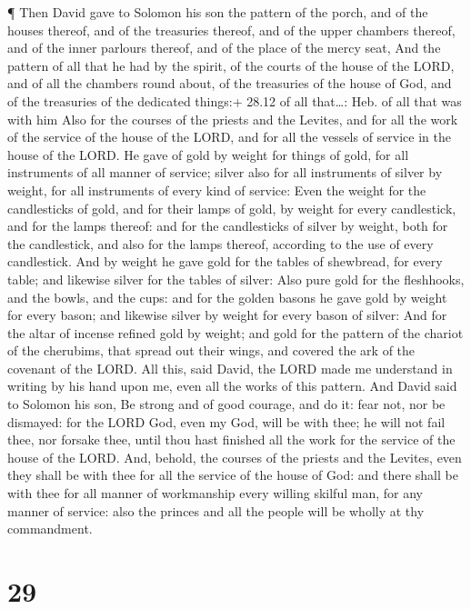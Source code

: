  ¶ Then David gave to Solomon his son the pattern of the
porch, and of the houses thereof, and of the treasuries thereof, and of
the upper chambers thereof, and of the inner parlours thereof, and of
the place of the mercy seat,  And the pattern of all that
he had by the spirit, of the courts of the house of the LORD, and of all
the chambers round about, of the treasuries of the house of God, and of
the treasuries of the dedicated things:+ 28.12 of all that\ldots: Heb.
of all that was with him  Also for the courses of the
priests and the Levites, and for all the work of the service of the
house of the LORD, and for all the vessels of service in the house of
the LORD.  He gave of gold by weight for things of gold,
for all instruments of all manner of service; silver also for all
instruments of silver by weight, for all instruments of every kind of
service:  Even the weight for the candlesticks of gold, and
for their lamps of gold, by weight for every candlestick, and for the
lamps thereof: and for the candlesticks of silver by weight, both for
the candlestick, and also for the lamps thereof, according to the use of
every candlestick.  And by weight he gave gold for the
tables of shewbread, for every table; and likewise silver for the tables
of silver:  Also pure gold for the fleshhooks, and the
bowls, and the cups: and for the golden basons he gave gold by weight
for every bason; and likewise silver by weight for every bason of
silver:  And for the altar of incense refined gold by
weight; and gold for the pattern of the chariot of the cherubims, that
spread out their wings, and covered the ark of the covenant of the LORD.
 All this, said David, the LORD made me understand in
writing by his hand upon me, even all the works of this pattern.
 And David said to Solomon his son, Be strong and of good
courage, and do it: fear not, nor be dismayed: for the LORD God, even my
God, will be with thee; he will not fail thee, nor forsake thee, until
thou hast finished all the work for the service of the house of the
LORD.  And, behold, the courses of the priests and the
Levites, even they shall be with thee for all the service of the house
of God: and there shall be with thee for all manner of workmanship every
willing skilful man, for any manner of service: also the princes and all
the people will be wholly at thy commandment.

\hypertarget{section-28}{%
\section{29}\label{section-28}}

